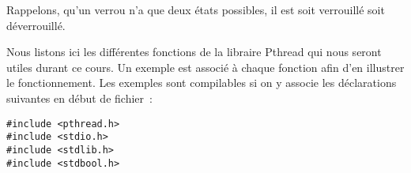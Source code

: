 \hspace{1cm}

\hspace{7cm}

Rappelons, qu'un verrou n'a que deux états possibles, il est soit verrouillé soit déverrouillé.

Nous listons ici les différentes fonctions de la libraire Pthread qui nous seront utiles durant ce cours. Un exemple est associé à chaque fonction afin d'en illustrer le fonctionnement. Les exemples sont compilables si on y associe les déclarations suivantes en début de fichier~:
\begin{lstlisting}
#include <pthread.h>
#include <stdio.h>
#include <stdlib.h>
#include <stdbool.h>
\end{lstlisting}

